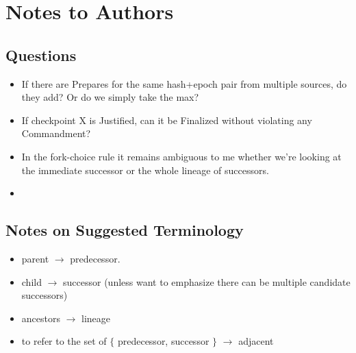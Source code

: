 \section{Notes to Authors}
\subsection{Questions}
\begin{itemize}
\item If there are Prepares for the same hash+epoch pair from multiple sources, do they add?  Or do we simply take the max?
\item If checkpoint X is Justified, can it be Finalized without violating any Commandment?
\item In the fork-choice rule it remains ambiguous to me whether we're looking at the immediate successor or the whole lineage of successors.
\item {}
\end{itemize}


\subsection{Notes on Suggested Terminology}
\begin{itemize}
\item parent $\rightarrow$ predecessor.
\item child $\rightarrow$ successor (unless want to emphasize there can be multiple candidate successors)
\item ancestors $\rightarrow$ lineage
\item to refer to the set of $\{$ predecessor, successor $\}$ $\rightarrow$ adjacent
\end{itemize}
